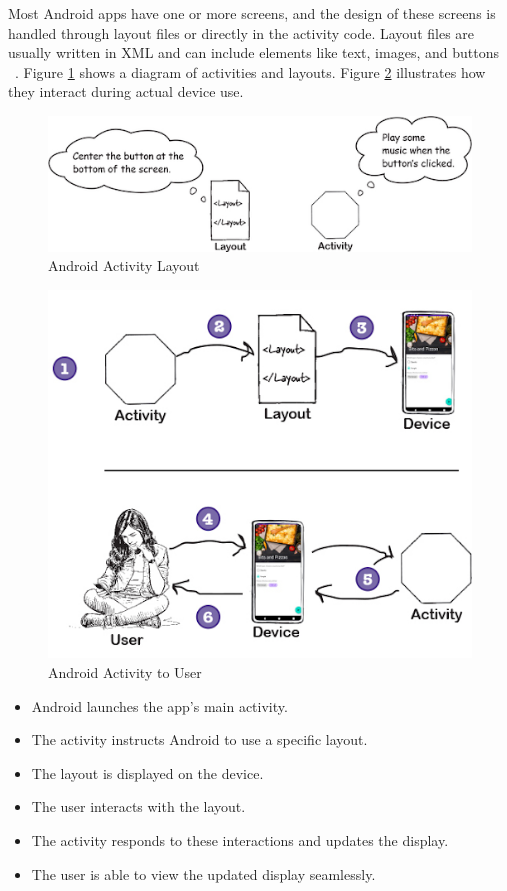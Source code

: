 Most Android apps have one or more screens, and the design of these screens is handled through layout files or directly in the activity code. Layout files are usually written in XML and can include elements like text, images, and buttons ~\cite{headfirstandroid}. Figure \ref{fig:activitylayout} shows a diagram of activities and layouts. Figure \ref{fig:activitylayoutprocess} illustrates how they interact during actual device use.
\begin{figure}[H]
	\centering
	\includegraphics[scale=0.65]{activity_layout.png}
	\caption{Android Activity Layout}
	\label{fig:activitylayout}
\end{figure}
\begin{figure}[H]
	\centering
	\includegraphics[scale=0.35]{activity_layout_process}
	\caption{Android Activity to User}
	\label{fig:activitylayoutprocess}
\end{figure}

\begin{itemize} 
	\item Android launches the app’s main activity.
	\item The activity instructs Android to use a specific layout.
	\item The layout is displayed on the device.
	\item The user interacts with the layout.
	\item The activity responds to these interactions and updates the display.
	\item The user is able to view the updated display seamlessly.
\end{itemize}

